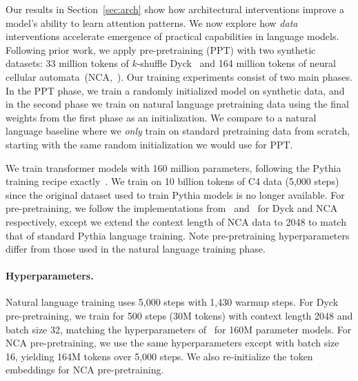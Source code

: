 \documentclass{article}
\begin{document}
Our results in Section~\ref{sec:arch} show how architectural interventions improve a model's ability to learn attention patterns. We now explore how \textit{data} interventions accelerate emergence of practical capabilities in language models. Following prior work, we apply pre-pretraining (PPT) with two synthetic datasets: 33 million tokens of $k$-shuffle Dyck~\citep{hu2025circuitschomskyprepretrainingformal} and 164 million tokens of neural cellular automata~(NCA,~\citet{lee2026traininglanguagemodelsneural}). Our training experiments consist of two main phases. In the PPT phase, we train a randomly initialized model on synthetic data, and in the second phase we train on natural language pretraining data using the final weights from the first phase as an initialization. We compare to a natural language baseline where we \textit{only} train on standard pretraining data from scratch, starting with the same random initialization we would use for PPT.

We train transformer models with 160 million parameters, following the Pythia training recipe exactly~\citep{biderman2023pythiasuiteanalyzinglarge}. We train on 10 billion tokens of C4 data (5,000 steps) since the original dataset used to train Pythia models is no longer available. For pre-pretraining, we follow the implementations from~\citet{hu2025circuitschomskyprepretrainingformal} and~\citet{lee2026traininglanguagemodelsneural} for Dyck and NCA respectively, except we extend the context length of NCA data to 2048 to match that of standard Pythia language training. Note pre-pretraining hyperparameters differ from those used in the natural language training phase. 

\paragraph{Hyperparameters.} Natural language training uses 5,000 steps with 1,430 warmup steps. For Dyck pre-pretraining, we train for 500 steps (30M tokens) with context length 2048 and batch size 32, matching the hyperparameters of~\citet{hu2025circuitschomskyprepretrainingformal} for 160M parameter models. For NCA pre-pretraining, we use the same hyperparameters except with batch size 16, yielding 164M tokens over 5,000 steps. We also re-initialize the token embeddings for NCA pre-pretraining.
\end{document}
